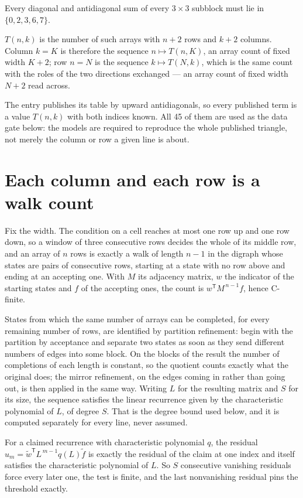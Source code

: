 \documentclass[11pt]{article}
\theoremstyle{definition}
\begin{document}
Every diagonal and antidiagonal sum of every $3\times3$ subblock must lie in $\{0, 2, 3, 6, 7\}$.

$T(n,k)$ is the number of such arrays with $n + 2$ rows and $k + 2$ columns. Column $k = K$ is therefore the sequence $n \mapsto T(n,K)$, an array count of fixed width $K + 2$; row $n = N$ is the sequence $k \mapsto T(N,k)$, which is the same count with the roles of the two directions exchanged --- an array count of fixed width $N + 2$ read across.

The entry publishes its table by upward antidiagonals, so every published term is a value $T(n,k)$ with both indices known. All 45 of them are used as the data gate below: the models are required to reproduce the whole published triangle, not merely the column or row a given line is about.

\section{Each column and each row is a walk count}

Fix the width. The condition on a cell reaches at most one row up and one row down, so a window of three consecutive rows decides the whole of its middle row, and an array of $n$ rows is exactly a walk of length $n-1$ in the digraph whose states are pairs of consecutive rows, starting at a state with no row above and ending at an accepting one. With $M$ its adjacency matrix, $w$ the indicator of the starting states and $f$ of the accepting ones, the count is $w^{\mathsf T}M^{\,n-1}f$, hence C-finite.

States from which the same number of arrays can be completed, for every remaining number of rows, are identified by partition refinement: begin with the partition by acceptance and separate two states as soon as they send different numbers of edges into some block. On the blocks of the result the number of completions of each length is constant, so the quotient counts exactly what the original does; the mirror refinement, on the edges coming in rather than going out, is then applied in the same way. Writing $L$ for the resulting matrix and $S$ for its size, the sequence satisfies the linear recurrence given by the characteristic polynomial of $L$, of degree $S$. That is the degree bound used below, and it is computed separately for every line, never assumed.

For a claimed recurrence with characteristic polynomial $q$, the residual $u_m = \tilde w^{\mathsf T}L^{\,m-1}q(L)\tilde f$ is exactly the residual of the claim at one index and itself satisfies the characteristic polynomial of $L$. So $S$ consecutive vanishing residuals force every later one, the test is finite, and the last nonvanishing residual pins the threshold exactly.
\end{document}
